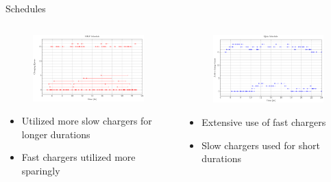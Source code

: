 \documentclass[aspectratio=169]{beamer}
\begin{document}
\begin{frame}[label={sec:org6742e61}]{Schedules}
\begin{columns}
\begin{column}{0.5\columnwidth}
\begin{figure}[htpb]
\centering
    \includegraphics[width=\textwidth]{img/milp-pap/schedule-milp-pap}
\end{figure}

\begin{itemize}
\item Utilized more slow chargers for longer durations
\item Fast chargers utilized more sparingly
\end{itemize}
\end{column}

\begin{column}{0.5\columnwidth}
\begin{figure}[htpb]
\centering
    \includegraphics[width=\textwidth]{img/milp-pap/schedule-qin}
\end{figure}

\begin{itemize}
\item Extensive use of fast chargers
\item Slow chargers used for short durations
\end{itemize}
\end{column}
\end{columns}
\end{frame}
\end{document}

